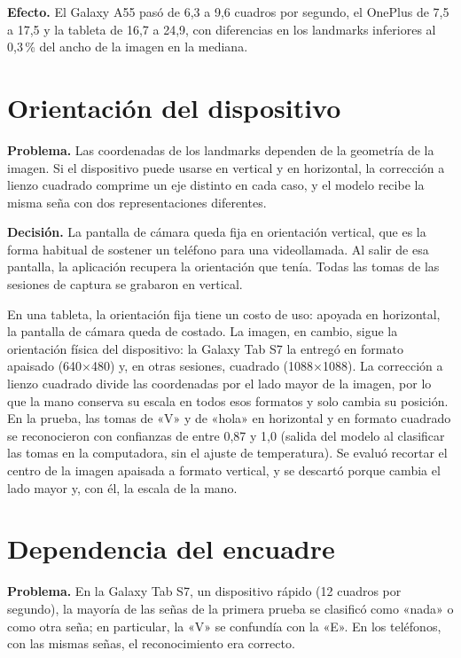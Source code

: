 \textbf{Efecto.} El Galaxy A55 pasó de 6,3 a 9,6 cuadros por segundo, el OnePlus de 7,5 a 17,5 y la tableta de 16,7 a 24,9, con diferencias en los landmarks inferiores al 0,3\,\% del ancho de la imagen en la mediana.

\section{Orientación del dispositivo}

\textbf{Problema.} Las coordenadas de los landmarks dependen de la geometría de la imagen. Si el dispositivo puede usarse en vertical y en horizontal, la corrección a lienzo cuadrado comprime un eje distinto en cada caso, y el modelo recibe la misma seña con dos representaciones diferentes.

\textbf{Decisión.} La pantalla de cámara queda fija en orientación vertical, que es la forma habitual de sostener un teléfono para una videollamada. Al salir de esa pantalla, la aplicación recupera la orientación que tenía. Todas las tomas de las sesiones de captura se grabaron en vertical.

En una tableta, la orientación fija tiene un costo de uso: apoyada en horizontal, la pantalla de cámara queda de costado. La imagen, en cambio, sigue la orientación física del dispositivo: la Galaxy Tab S7 la entregó en formato apaisado (640$\times$480) y, en otras sesiones, cuadrado (1088$\times$1088). La corrección a lienzo cuadrado divide las coordenadas por el lado mayor de la imagen, por lo que la mano conserva su escala en todos esos formatos y solo cambia su posición. En la prueba, las tomas de «V» y de «hola» en horizontal y en formato cuadrado se reconocieron con confianzas de entre 0,87 y 1,0 (salida del modelo al clasificar las tomas en la computadora, sin el ajuste de temperatura). Se evaluó recortar el centro de la imagen apaisada a formato vertical, y se descartó porque cambia el lado mayor y, con él, la escala de la mano.

\section{Dependencia del encuadre}
\label{sec:encuadre}

\textbf{Problema.} En la Galaxy Tab S7, un dispositivo rápido (12 cuadros por segundo), la mayoría de las señas de la primera prueba se clasificó como «nada» o como otra seña; en particular, la «V» se confundía con la «E». En los teléfonos, con las mismas señas, el reconocimiento era correcto.

